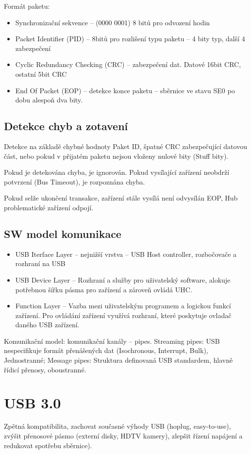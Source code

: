 \documentclass[a4paper, 11pt]{report}
\begin{document}
Formát paketu:
\begin{itemize}
	\item Synchronizační sekvence -- (0000 0001) 8 bitů pro odvození hodin
	\item Packet Identifier (PID) -- 8bitů pro rozlišení typu paketu -- 4 bity typ, další 4 zabezpečení
	\item Cyclic Redundancy Checking (CRC) -- zabezpečení dat. Datové 16bit CRC, ostatní 5bit CRC
	\item End Of Packet (EOP) -- detekce konce paketu -- sběrnice ve stavu SE0 po dobu alespoň dva bity.
\end{itemize}

\subsection{Detekce chyb a zotavení}
Detekce na základě chybné hodnoty Paket ID, špatné CRC zabezpečující datovou část, nebo pokud v přijatém paketu nejsou vloženy nulové bity (Stuff bity).

Pokud je detekována chyba, je ignorován. Pokud vysílající zařízení neobdrží potvrzení (Bus Timeout), je rozpoznána chyba.

Pokud selže ukončení transakce, zařízení stále vysílá není odvysílán EOP, Hub problematické zařízení odpojí.

\subsection{SW model komunikace}
\begin{itemize}
	\item USB Iterface Layer -- nejnižší vrstva -- USB Host controller, rozbočovače a rozhraní na USB
	\item USB Device Layer -- Rozhraní a služby pro uživatelský software, alokuje potřebnou šířku pásma pro zařízení a zároveň ovládá UHC.
	\item Function Layer -- Vazba mezi uživatelským programem a logickou funkcí zařízení. Pro ovládání zařízení využívá rozhraní, které poskytuje ovladač daného USB zařízení.
\end{itemize}

Komunikační model: komunikační kanály --  pipes. Streaming pipes: USB nespecifikuje formát přenášených dat (Isochronous, Interrupt, Bulk), Jednostranné; Message pipes: Struktura definovaná USB standardem, hlavně řídicí přenosy, oboustranné.

\section{USB 3.0}
Zpětná kompatibilita, zachovat současné výhody USB (hoplug, easy-to-use), zvýšit přenosové pásmo (externí disky, HDTV kamery), zlepšit řízení napájení a redukovat spotřebu sběrnice).
\end{document}
